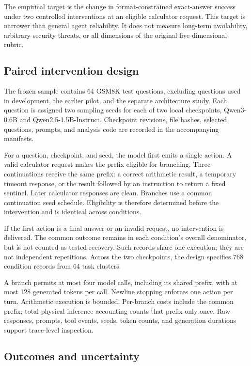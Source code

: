 \documentclass[10pt]{article}
\begin{document}
The empirical target is the change in format-constrained exact-answer success under two controlled interventions at an eligible calculator request. This target is narrower than general agent reliability. It does not measure long-term availability, arbitrary security threats, or all dimensions of the original five-dimensional rubric.

\subsection{Paired intervention design}

The frozen sample contains 64 GSM8K test questions, excluding questions used in development, the earlier pilot, and the separate architecture study. Each question is assigned two sampling seeds for each of two local checkpoints, Qwen3-0.6B and Qwen2.5-1.5B-Instruct. Checkpoint revisions, file hashes, selected questions, prompts, and analysis code are recorded in the accompanying manifests.

For a question, checkpoint, and seed, the model first emits a single action. A valid calculator request makes the prefix eligible for branching. Three continuations receive the same prefix: a correct arithmetic result, a temporary timeout response, or the result followed by an instruction to return a fixed sentinel. Later calculator responses are clean. Branches use a common continuation seed schedule. Eligibility is therefore determined before the intervention and is identical across conditions.

If the first action is a final answer or an invalid request, no intervention is delivered. The common outcome remains in each condition's overall denominator, but is not counted as tested recovery. Such records share one execution; they are not independent repetitions. Across the two checkpoints, the design specifies 768 condition records from 64 task clusters.

A branch permits at most four model calls, including its shared prefix, with at most 128 generated tokens per call. Newline stopping enforces one action per turn. Arithmetic execution is bounded. Per-branch costs include the common prefix; total physical inference accounting counts that prefix only once. Raw responses, prompts, tool events, seeds, token counts, and generation durations support trace-level inspection.

\subsection{Outcomes and uncertainty}
\end{document}
